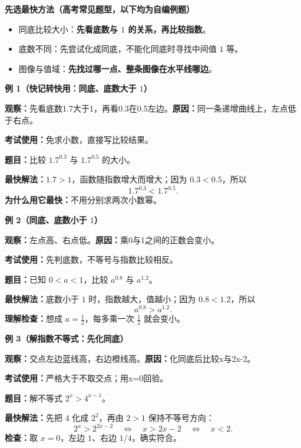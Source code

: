 \clearpage
\begin{examplebox}

\textbf{\textcolor{CExample}{先选最快方法（高考常见题型，以下均为自编例题）}}
\begin{itemize}[leftmargin=*,itemsep=0.35em,topsep=0.3em]
  \item 同底比较大小：\textbf{先看底数与 $1$ 的关系，再比较指数}。
  \item 底数不同：先尝试化成同底，不能化同底时寻找中间值 $1$ 等。
  \item 图像与值域：\textbf{先找过哪一点、整条图像在水平线哪边}。
\end{itemize}

\medskip
\textbf{\textcolor{CExample}{例 1（快记转快用：同底、底数大于 $1$）}}

\textbf{观察：}先看底数1.7大于1，再看0.3在0.5左边。\quad\textbf{原因：}同一条递增曲线上，左点低于右点。

\textbf{考试使用：}免求小数，直接写比较结果。



\textbf{题目：}比较 $1.7^{0.3}$ 与 $1.7^{0.5}$ 的大小。

\textbf{最快解法：}$1.7>1$，函数随指数增大而增大；因为 $0.3<0.5$，所以
\[
  \boxed{1.7^{0.3}<1.7^{0.5}}.
\]
\textbf{为什么用它最快：}不用分别求两次小数幂。

\medskip

\end{examplebox}
\clearpage
\begin{examplebox}
\textbf{\textcolor{CExample}{例 2（同底、底数小于 $1$）}}

\textbf{观察：}左点高、右点低。\quad\textbf{原因：}乘0与1之间的正数会变小。

\textbf{考试使用：}先判底数，不等号与指数比较相反。



\textbf{题目：}已知 $0<a<1$，比较 $a^{0.8}$ 与 $a^{1.2}$。

\textbf{最快解法：}底数小于 $1$ 时，指数越大，值越小；因为 $0.8<1.2$，所以
\[
  \boxed{a^{0.8}>a^{1.2}}.
\]
\textbf{理解检查：}想成 $a=\frac12$，每多乘一次 $\frac12$ 就会变小。

\medskip

\end{examplebox}
\clearpage
\begin{examplebox}
\textbf{\textcolor{CExample}{例 3（解指数不等式：先化同底）}}

\textbf{观察：}交点左边蓝线高，右边橙线高。\quad\textbf{原因：}化同底后比较x与2x-2。

\textbf{考试使用：}严格大于不取交点；用x=0回验。



\textbf{题目：}解不等式 $2^{x}>4^{x-1}$。

\textbf{最快解法：}先把 $4$ 化成 $2^2$，再由 $2>1$ 保持不等号方向：
\[
  2^x>2^{2x-2}\quad\Longleftrightarrow\quad x>2x-2
  \quad\Longleftrightarrow\quad\boxed{x<2}.
\]
\textbf{检查：}取 $x=0$，左边 $1$、右边 $1/4$，确实符合。

\medskip

\end{examplebox}

